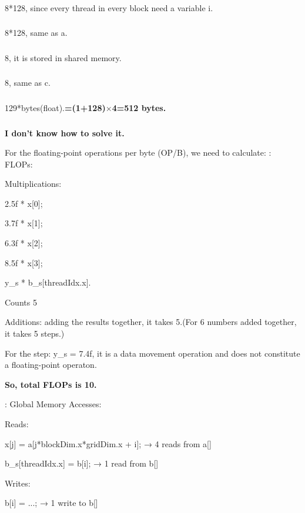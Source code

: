 \documentclass{article}
\begin{document}
\subsubsection{}
8*128, since every thread in every block need a variable i.
\subsubsection{}
8*128, same as a.
\subsubsection{}
8, it is stored in shared memory.
\subsubsection{}
8, same as c.
\subsubsection{}
129*bytes(float).\textbf{=(1+128)$\times$4=512 bytes.}
\subsubsection{}
\textbf{I don't know how to solve it.}

For the floating-point operations per byte (OP/B), we need to calculate:
: FLOPs:

Multiplications:

2.5f * x[0];

3.7f * x[1];

6.3f * x[2];

8.5f * x[3];

y\_s * b\_s[threadIdx.x].

Counts 5

Additions:
adding the results together, it takes 5.(For 6 numbers added together, it takes 5 steps.)

For the step: y\_s = 7.4f, it is a data movement operation and does not constitute a floating-point operaton.

\textbf{So, total FLOPs is 10.}

: Global Memory Accesses:

Reads:

x[j] = a[j*blockDim.x*gridDim.x + i]; → 4 reads from a[]

b\_s[threadIdx.x] = b[i]; → 1 read from b[]

Writes:

b[i] = ...; → 1 write to b[]
\end{document}
